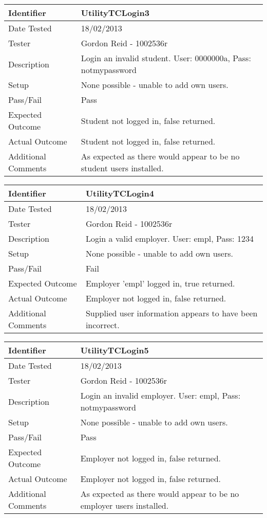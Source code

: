 \documentclass[11pt]{l3deliverable}
\begin{document}
\begin{tabularx}{\textwidth}{|T|L|}
\hline
Identifier & UtilityTCLogin3\\
\hline
Date Tested & 18/02/2013\\
\hline
Tester & Gordon Reid - 1002536r\\
\hline
Description & Login an invalid student. User: 0000000a, Pass: notmypassword\\
\hline
Setup & None possible - unable to add own users.\\
\hline
Pass/Fail & Pass\\
\hline
Expected Outcome & Student not logged in, false returned.\\
\hline
Actual Outcome & Student not logged in, false returned.\\
\hline
Additional Comments & As expected as there would appear to be no student 
users installed.\\
\hline
\end{tabularx}

\vspace{2em}

\begin{tabularx}{\textwidth}{|T|L|}
\hline
Identifier & UtilityTCLogin4\\
\hline
Date Tested & 18/02/2013\\
\hline
Tester & Gordon Reid - 1002536r\\
\hline
Description & Login a valid employer. User: empl, Pass: 1234\\
\hline
Setup & None possible - unable to add own users.\\
\hline
Pass/Fail & Fail\\
\hline
Expected Outcome & Employer 'empl' logged in, true returned.\\
\hline
Actual Outcome & Employer not logged in, false returned.\\
\hline
Additional Comments & Supplied user information appears to have been incorrect.
\\
\hline
\end{tabularx}

\vspace{2em}

\begin{tabularx}{\textwidth}{|T|L|}
\hline
Identifier & UtilityTCLogin5\\
\hline
Date Tested & 18/02/2013\\
\hline
Tester & Gordon Reid - 1002536r\\
\hline
Description & Login an invalid employer. User: empl, Pass: notmypassword\\
\hline
Setup & None possible - unable to add own users.\\
\hline
Pass/Fail & Pass\\
\hline
Expected Outcome & Employer not logged in, false returned.\\
\hline
Actual Outcome & Employer not logged in, false returned.\\
\hline
Additional Comments & As expected as there would appear to be no employer users 
installed.\\
\hline
\end{tabularx}
\end{document}
